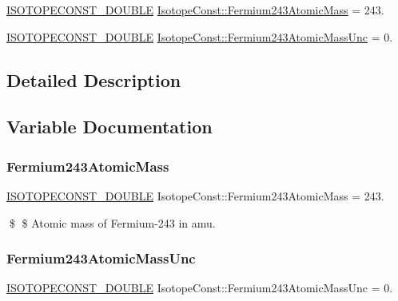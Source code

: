\begin{DoxyCompactItemize}
\item 
\mbox{\hyperlink{group___isotope_const-_macros_ga8f45a7272ce02c0b4c65c44636ed719a}{I\+S\+O\+T\+O\+P\+E\+C\+O\+N\+S\+T\+\_\+\+D\+O\+U\+B\+LE}} \mbox{\hyperlink{group___isotope_const-_fermium-_fm243_gaaf1a9b148920dbdd4b8b25cb6910c916}{Isotope\+Const\+::\+Fermium243\+Atomic\+Mass}} = 243.
\item 
\mbox{\hyperlink{group___isotope_const-_macros_ga8f45a7272ce02c0b4c65c44636ed719a}{I\+S\+O\+T\+O\+P\+E\+C\+O\+N\+S\+T\+\_\+\+D\+O\+U\+B\+LE}} \mbox{\hyperlink{group___isotope_const-_fermium-_fm243_gade851d147965c67bd474025ec7a2715a}{Isotope\+Const\+::\+Fermium243\+Atomic\+Mass\+Unc}} = 0.
\end{DoxyCompactItemize}


\subsection{Detailed Description}


\subsection{Variable Documentation}
\mbox{\label{group___isotope_const-_fermium-_fm243_gaaf1a9b148920dbdd4b8b25cb6910c916}} 
\subsubsection{\texorpdfstring{Fermium243\+Atomic\+Mass}{Fermium243AtomicMass}}
{\footnotesize\ttfamily \mbox{\hyperlink{group___isotope_const-_macros_ga8f45a7272ce02c0b4c65c44636ed719a}{I\+S\+O\+T\+O\+P\+E\+C\+O\+N\+S\+T\+\_\+\+D\+O\+U\+B\+LE}} Isotope\+Const\+::\+Fermium243\+Atomic\+Mass = 243.}

\$ \$ Atomic mass of Fermium-\/243 in amu. \mbox{\label{group___isotope_const-_fermium-_fm243_gade851d147965c67bd474025ec7a2715a}} 
\subsubsection{\texorpdfstring{Fermium243\+Atomic\+Mass\+Unc}{Fermium243AtomicMassUnc}}
{\footnotesize\ttfamily \mbox{\hyperlink{group___isotope_const-_macros_ga8f45a7272ce02c0b4c65c44636ed719a}{I\+S\+O\+T\+O\+P\+E\+C\+O\+N\+S\+T\+\_\+\+D\+O\+U\+B\+LE}} Isotope\+Const\+::\+Fermium243\+Atomic\+Mass\+Unc = 0.}

